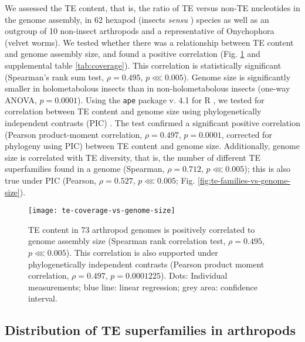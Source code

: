 We assessed the TE content, that is, the ratio of TE versus non-TE
nucleotides in the genome assembly, in 62 hexapod (insects \emph{sensu}
\citep{Misof2014}) species as well as an outgroup of 10 non-insect
arthropods and a representative of Onychophora (velvet worms). We tested
whether there was a relationship between TE content and genome assembly
size, and found a positive correlation (Fig. \ref{fig:te-coverage-vs-genome-size} and supplemental table
\ref{tab:coverage}). This correlation is statistically significant (Spearman's rank sum
test, \(\rho = 0.495\), \(p \lll 0.005\)). Genome size is significantly
smaller in holometabolous insects than in non-holometabolous insects
(one-way ANOVA, \(p = 0.0001\)). Using the \texttt{ape} package v. 4.1
\citep{Paradis2004} for R \citep{RCoreTeam2017}, we tested for correlation
between TE content and genome size using phylogenetically independent
contrasts (PIC) \citep{Felsenstein1985}. The test confirmed a significant
positive correlation (Pearson product-moment correlation,
\(\rho = 0.497\), \(p = 0.0001\), corrected for phylogeny using PIC)
between TE content and genome size. Additionally, genome size is
correlated with TE diversity, that is, the number of different TE
superfamilies found in a genome (Spearman, \(\rho = 0.712\),
\(p \lll 0.005\)); this is also true under PIC (Pearson,
\(\rho = 0.527\), \(p \lll 0.005\); Fig. \ref{fig:te-families-vs-genome-size}).

\begin{figure}[h!]
\begin{center}
\texttt{[image: te-coverage-vs-genome-size]}
\caption[TE content is positively correlated to genome size in arthropods]{{TE content in 73 arthropod genomes is positively correlated to genome
assembly size (Spearman rank correlation test, \(\rho = 0.495\),
\(p \lll 0.005\)). This correlation is also supported under
phylogenetically independent contrasts \protect\citep{Felsenstein1985} (Pearson
product moment correlation, \(\rho = 0.497\), \(p = 0.0001225\)). Dots:
Individual measurements; blue line: linear regression; grey area:
confidence interval.%
\label{fig:te-coverage-vs-genome-size}
}}
\end{center}
\end{figure}

\subsection{Distribution of TE superfamilies in
arthropods}

